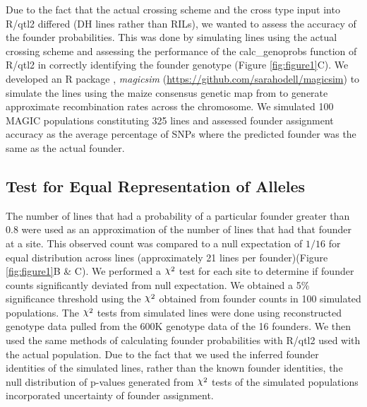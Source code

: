 \documentclass[9pt,twocolumn,twoside]{gsag3jnl}
\DeclareRobustCommand{\rchi}{{\mathpalette\irchi\relax}}
\newcommand{\irchi}[2]{\raisebox{\depth}{$#1\chi$}} %
\begin{document}
Due to the fact that the actual crossing scheme and the cross type input into R/qtl2 differed (DH lines rather than RILs), we wanted to assess the accuracy of the founder probabilities.
This was done by simulating lines using the actual crossing scheme and assessing the performance of the calc\_genoprobs function of R/qtl2 in correctly identifying the founder genotype (Figure \ref{fig:figure1}C).
We developed an R package \citep{R}, \emph{magicsim} (\url{https://github.com/sarahodell/magicsim}) to simulate the lines using the maize consensus genetic map from \citep{Ogut} to generate approximate recombination rates across the chromosome.
We simulated 100 MAGIC populations constituting 325 lines and assessed founder assignment accuracy as the average percentage of SNPs where the predicted founder was the same as the actual founder.

\subsection{Test for Equal Representation of Alleles}
The number of lines that had a probability of a particular founder greater than 0.8 were used as  an approximation of the number of lines that had that founder at a site.
This observed count was compared to a null expectation of $1/16$ for equal distribution across lines (approximately 21 lines per founder)(Figure \ref{fig:figure1}B \& C).
We performed a $\rchi^2$ test for each site to determine if founder counts significantly deviated from null expectation.
We obtained a 5\% significance threshold using the $\rchi^2$ obtained from founder counts in 100 simulated populations.
The $\rchi^2$ tests from simulated lines were done using reconstructed genotype data pulled from the 600K genotype data of the 16 founders.
We then used the same methods of calculating founder probabilities with R/qtl2 used with the actual population.
Due to the fact that we used the inferred founder identities of the simulated lines, rather than the known founder identities, the null distribution of p-values generated from $\rchi^2$ tests of the simulated populations incorporated uncertainty of founder assignment.
\end{document}
